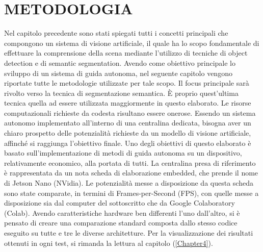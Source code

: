 
\chapter{METODOLOGIA}
\label{Capitolo3}
\thispagestyle{empty}

Nel capitolo precedente sono stati spiegati tutti i concetti principali che 
compongono un sistema di visione artificiale, il quale ha lo scopo fondamentale 
di effettuare la comprensione della scena mediante l'utilizzo di tecniche 
di object detection e di semantic segmentation. Avendo come obiettivo 
principale lo sviluppo di un sistema di guida autonoma, nel seguente capitolo 
vengono riportate tutte le metodologie utilizzate per tale scopo. Il focus 
principale sarà rivolto verso la tecnica di segmentazione semantica. È 
proprio quest'ultima tecnica quella ad essere utilizzata maggiormente in 
questo elaborato. Le risorse computazionali richieste da codesta risultano 
essere onerose. Essendo un sistema autonomo implementato all'interno di 
una centralina dedicata, bisogna aver un chiaro prospetto delle potenzialità 
richieste da un modello di visione artificiale, affinché si raggiunga l'obiettivo 
finale. Uno degli obiettivi di questo elaborato è basato sull'implementazione 
di metodi di guida autonoma su un dispositivo, relativamente economico, 
alla portata di tutti. La centralina presa di riferimento è rappresentata da 
un nota scheda di elaborazione embedded, che prende il nome di Jetson 
Nano (NVidia). Le potenzialità messe a disposizione da questa scheda sono 
state comparate, in termini di Frames-per-Second (FPS), con quelle messe 
a disposizione sia dal computer del sottoscritto che da Google Colaboratory 
(Colab). Avendo caratteristiche hardware ben differenti l'uno dall'altro, si è 
pensato di creare una comparazione standard composta dallo stesso codice 
eseguito su tutte e tre le diverse architetture. Per la visualizzazione dei 
risultati ottenuti in ogni test, si rimanda la lettura al capitolo (\ref{Chapter4}).

